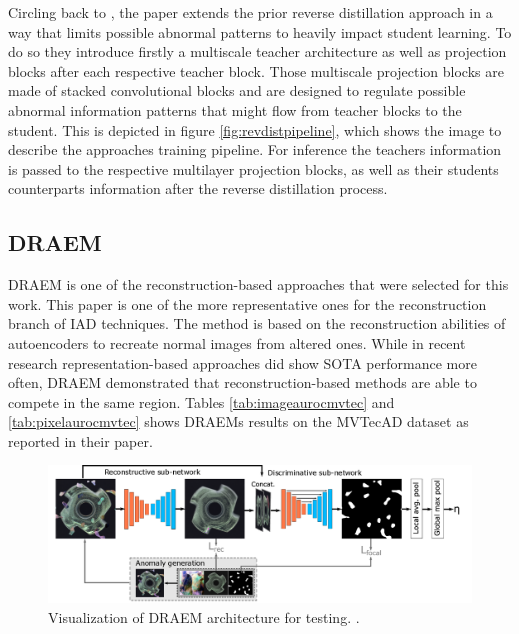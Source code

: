 Circling back to \cite{revdist2023}, the paper extends the prior reverse distillation approach in a way that limits possible abnormal patterns to heavily impact student learning. To do so they 
introduce firstly a multiscale teacher architecture as well as projection blocks after each respective teacher block. Those multiscale projection blocks are made of stacked convolutional blocks 
and are designed to regulate possible abnormal information patterns that might flow from teacher blocks to the student. This is depicted in figure \ref{fig:revdistpipeline}, which shows the image to describe the 
approaches training pipeline. For inference the teachers information is passed to the respective multilayer projection blocks, as well as their students counterparts information after the 
reverse distillation process.



\subsection{DRAEM}
\label{subsec:DRAEM}

DRAEM \cite{Zavrtanik_2021DRAEM} is one of the reconstruction-based approaches that were selected for this work. This paper is one of the more representative ones for the reconstruction branch of 
IAD techniques. The method is based on the reconstruction abilities of autoencoders to recreate normal images from altered ones. While in recent research representation-based approaches did 
show SOTA performance more often, DRAEM demonstrated that reconstruction-based methods are able to compete in the same region. Tables \ref{tab:imageaurocmvtec} and 
\ref{tab:pixelaurocmvtec} shows DRAEMs results on the MVTecAD dataset as reported 
in their paper.\newline

\begin{figure}[ht]
    \centering
    \includegraphics[width=\textwidth]{figures/DRAEM_pipeline.png}
    \caption{Visualization of DRAEM architecture for testing. \cite{Zavrtanik_2021DRAEM}.}
    \label{fig:draempipeline}
\end{figure}


